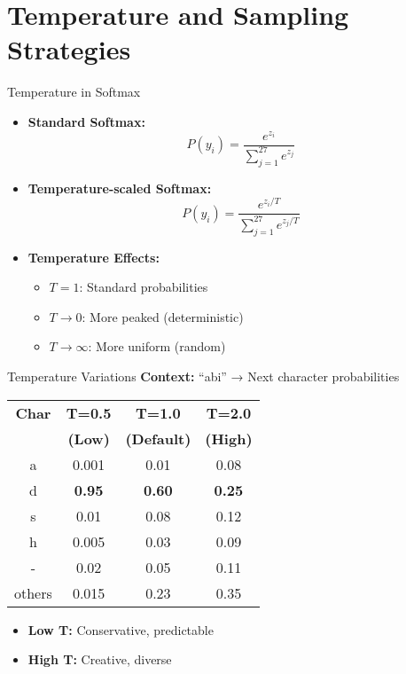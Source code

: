 \documentclass[usenames,dvipsnames]{beamer}
\begin{document}
\section{Temperature and Sampling Strategies}

\begin{frame}{Temperature in Softmax}
\begin{itemize}
\item \textbf{Standard Softmax:}
\begin{equation}
P(y_i) = \frac{e^{z_i}}{\sum_{j=1}^{27} e^{z_j}}
\end{equation}

\pause
\item \textbf{Temperature-scaled Softmax:}
\begin{equation}
P(y_i) = \frac{e^{z_i/T}}{\sum_{j=1}^{27} e^{z_j/T}}
\end{equation}

\pause
\item \textbf{Temperature Effects:}
\begin{itemize}
\item $T = 1$: Standard probabilities
\item $T \to 0$: More peaked (deterministic)
\pause
\item $T \to \infty$: More uniform (random)
\end{itemize}
\end{itemize}
\end{frame}

\begin{frame}{Temperature Variations}
\textbf{Context:} ``abi'' → Next character probabilities

\vspace{0.3cm}
\begin{center}
\begin{tabular}{|c|c|c|c|}
\hline
\textbf{Char} & \textbf{T=0.5} & \textbf{T=1.0} & \textbf{T=2.0} \\
 & \textbf{(Low)} & \textbf{(Default)} & \textbf{(High)} \\
\hline
a & 0.001 & 0.01 & 0.08 \\
d & \textbf{0.95} & \textbf{0.60} & \textbf{0.25} \\
s & 0.01 & 0.08 & 0.12 \\
h & 0.005 & 0.03 & 0.09 \\
- & 0.02 & 0.05 & 0.11 \\
others & 0.015 & 0.23 & 0.35 \\
\hline
\end{tabular}
\end{center}

\vspace{0.3cm}
\begin{itemize}
\item \textbf{Low T:} Conservative, predictable
\pause
\item \textbf{High T:} Creative, diverse
\end{itemize}
\end{frame}
\end{document}
